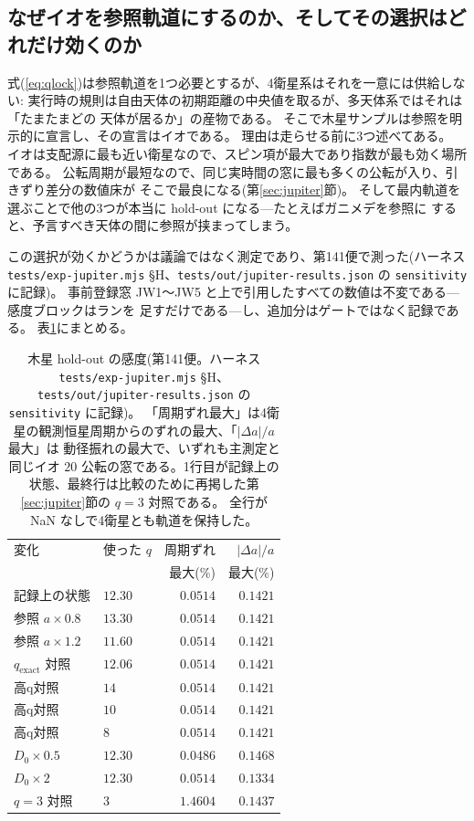 \documentclass[a4paper,10pt,twocolumn]{ltjsarticle}
\begin{document}
\subsection{なぜイオを参照軌道にするのか、そしてその選択はどれだけ効くのか}
\label{sec:jupsens}

式(\ref{eq:qlock})は参照軌道を1つ必要とするが、4衛星系はそれを一意には供給しない:
実行時の規則は自由天体の初期距離の中央値を取るが、多天体系ではそれは「たまたまどの
天体が居るか」の産物である。
そこで木星サンプルは参照を明示的に宣言し、その宣言はイオである。
理由は走らせる前に3つ述べてある。
イオは支配源に最も近い衛星なので、スピン項が最大であり指数が最も効く場所である。
公転周期が最短なので、同じ実時間の窓に最も多くの公転が入り、引きずり差分の数値床が
そこで最良になる(第\ref{sec:jupiter}節)。
そして最内軌道を選ぶことで他の3つが本当に hold-out になる---たとえばガニメデを参照に
すると、予言すべき天体の間に参照が挟まってしまう。

この選択が効くかどうかは議論ではなく測定であり、第141便で測った(ハーネス
\texttt{tests/exp-jupiter.mjs} \S H、\texttt{tests/out/jupiter-results.json} の
\texttt{sensitivity} に記録)。
事前登録窓 JW1〜JW5 と上で引用したすべての数値は不変である---感度ブロックはランを
足すだけである---し、追加分はゲートではなく記録である。
表\ref{tab:jupsens}にまとめる。

\begin{table}[t]
\centering
\caption{木星 hold-out の感度(第141便。ハーネス \texttt{tests/exp-jupiter.mjs} \S H、
  \texttt{tests/out/jupiter-results.json} の \texttt{sensitivity} に記録)。
  「周期ずれ最大」は4衛星の観測恒星周期からのずれの最大、「$|\Delta a|/a$ 最大」は
  動径振れの最大で、いずれも主測定と同じイオ $20$ 公転の窓である。1行目が記録上の
  状態、最終行は比較のために再掲した第\ref{sec:jupiter}節の $q=3$ 対照である。
  全行が NaN なしで4衛星とも軌道を保持した。}
\label{tab:jupsens}
{\setlength{\tabcolsep}{4pt}
\begin{tabular}{llrr}
\toprule
変化 & 使った $q$ & 周期ずれ & $|\Delta a|/a$ \\
 & & 最大(\%) & 最大(\%) \\
\midrule
記録上の状態 & $12.30$ & $0.0514$ & $0.1421$ \\
参照 $a\times0.8$ & $13.30$ & $0.0514$ & $0.1421$ \\
参照 $a\times1.2$ & $11.60$ & $0.0514$ & $0.1421$ \\
$q_{\mathrm{exact}}$ 対照 & $12.06$ & $0.0514$ & $0.1421$ \\
高q対照 & $14$ & $0.0514$ & $0.1421$ \\
高q対照 & $10$ & $0.0514$ & $0.1421$ \\
高q対照 & $8$ & $0.0514$ & $0.1421$ \\
$D_0\times0.5$ & $12.30$ & $0.0486$ & $0.1468$ \\
$D_0\times2$ & $12.30$ & $0.0514$ & $0.1334$ \\
$q=3$ 対照 & $3$ & $1.4604$ & $0.1437$ \\
\bottomrule
\end{tabular}}
\end{table}
\end{document}
